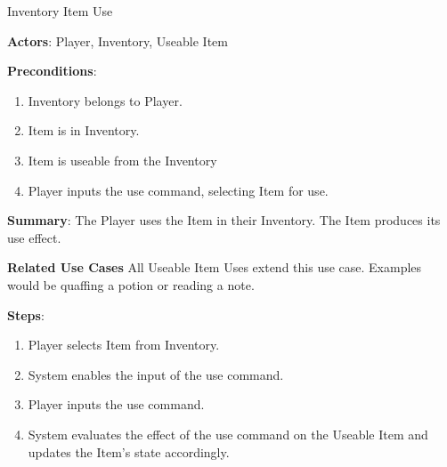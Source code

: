 \begin{subsection}{Inventory Item Use}

\textbf{Actors}:
Player, Inventory, Useable Item

\textbf{Preconditions}:
\begin{enumerate}
\item Inventory belongs to Player.
\item Item is in Inventory.
\item Item is useable from the Inventory
\item Player inputs the use command, selecting Item for use.
\end{enumerate}

\textbf{Summary}:
The Player uses the Item in their Inventory. The Item produces its
use effect.

\textbf{Related Use Cases}
All Useable Item Uses extend this use case. Examples would be quaffing
a potion or reading a note.

\textbf{Steps}:
\begin{enumerate}
\item Player selects Item from Inventory.
\item System enables the input of the use command.
\item Player inputs the use command.
\item System evaluates the effect of the use command on the
Useable Item and updates the Item's state accordingly.
\end{enumerate}
\end{subsection}



